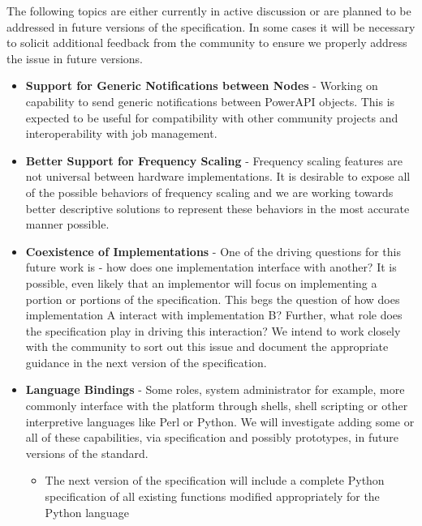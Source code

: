 

The following topics are either currently in active discussion or are planned to be addressed in future versions of the specification.
In some cases it will be necessary to solicit additional feedback from the community to ensure we properly address the issue in future versions.

\begin{itemize}[noitemsep,nolistsep]

\item{\textbf{Support for Generic Notifications between Nodes} - Working on capability to send generic notifications between PowerAPI objects. This is expected to be useful for compatibility with other community projects and interoperability with job management.}

\item{\textbf{Better Support for Frequency Scaling} - Frequency scaling features are not universal between hardware implementations. It is desirable to expose all of the possible behaviors of frequency scaling and we are working towards better descriptive solutions to represent these behaviors in the most accurate manner possible.}

\item{\textbf{Coexistence of Implementations} - One of the driving questions for this future work is - how does one implementation interface with another? It is possible, even likely that an implementor will focus on implementing a portion or portions of the specification. This begs the question of how does implementation A interact with implementation B? Further, what role does the specification play in driving this interaction? We intend to work closely with the community to sort out this issue and document the appropriate guidance in the next version of the specification.
}
\item{\textbf{Language Bindings} - Some roles, system administrator for example, more commonly interface with the platform through shells, shell scripting or other interpretive languages like Perl or Python. We will investigate adding some or all of these capabilities, via specification and possibly prototypes, in future versions of the standard.
}
    \begin{itemize}
        \item{The next version of the specification will include a complete Python specification of all existing functions modified appropriately for the Python language}
    \end{itemize}


\end{itemize}
